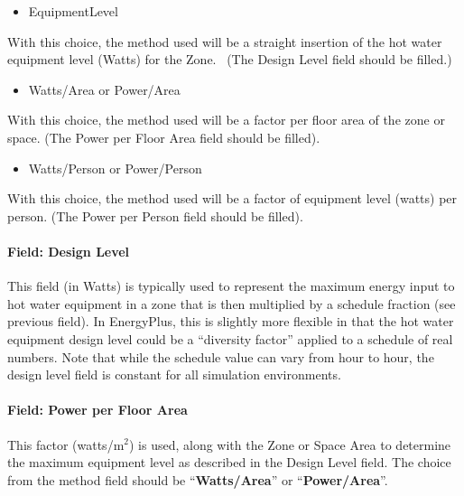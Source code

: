 \begin{itemize}
\tightlist
\item
  EquipmentLevel
\end{itemize}

With this choice, the method used will be a straight insertion of the hot water equipment level (Watts) for the Zone.~ (The Design Level field should be filled.)

\begin{itemize}
\tightlist
\item
  Watts/Area or Power/Area
\end{itemize}

With this choice, the method used will be a factor per floor area of the zone or space. (The Power per Floor Area field should be filled).

\begin{itemize}
\tightlist
\item
  Watts/Person or Power/Person
\end{itemize}

With this choice, the method used will be a factor of equipment level (watts) per person. (The Power per Person field should be filled).

\paragraph{Field: Design Level}\label{field-design-level-2-000}

This field (in Watts) is typically used to represent the maximum energy input to hot water equipment in a zone that is then multiplied by a schedule fraction (see previous field). In EnergyPlus, this is slightly more flexible in that the hot water equipment design level could be a ``diversity factor'' applied to a schedule of real numbers. Note that while the schedule value can vary from hour to hour, the design level field is constant for all simulation environments.

\paragraph{Field: Power per Floor Area}\label{field-power-per-zone-floor-area-1}

This factor (watts/m\(^{2}\)) is used, along with the Zone or Space Area to determine the maximum equipment level as described in the Design Level field. The choice from the method field should be ``\textbf{Watts/Area}'' or ``\textbf{Power/Area}''.

